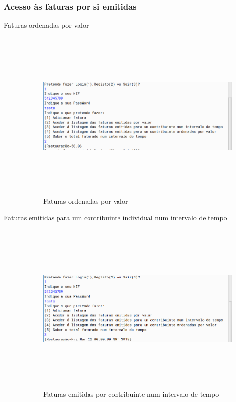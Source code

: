 \documentclass[a4paper]{article}
\begin{document}
		\subsubsection{Acesso às faturas por si emitidas}
			\begin{description}
				\item[Faturas ordenadas por valor]
					\begin{figure}[htbp]
						\centering
						\includegraphics[width = 320pt,height = 240pt]{faturasporvalorEmpresa.png}
						\caption{Faturas ordenadas por valor}
					\end{figure}
				\item[Faturas emitidas para um contribuinte individual num intervalo de tempo]
					\begin{figure}[htbp]
						\centering
						\includegraphics[width = 320pt,height = 240pt]{faturasemitidasporcontibuinte.png}
						\caption{Faturas emitidas por contribuinte num intervalo de tempo}
					\end{figure}

\end{description}
\end{document}
